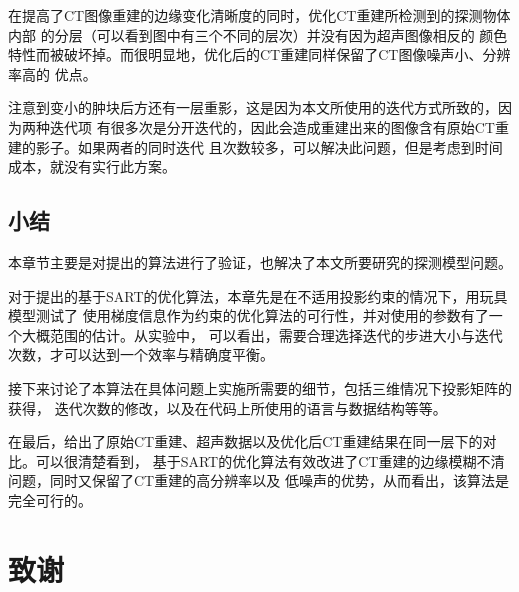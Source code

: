 在提高了CT图像重建的边缘变化清晰度的同时，优化CT重建所检测到的探测物体内部
的分层（可以看到图中有三个不同的层次）并没有因为超声图像相反的
颜色特性而被破坏掉。而很明显地，优化后的CT重建同样保留了CT图像噪声小、分辨率高的
优点。

注意到变小的肿块后方还有一层重影，这是因为本文所使用的迭代方式所致的，因为两种迭代项
有很多次是分开迭代的，因此会造成重建出来的图像含有原始CT重建的影子。如果两者的同时迭代
且次数较多，可以解决此问题，但是考虑到时间成本，就没有实行此方案。
\section{小结}
本章节主要是对提出的算法进行了验证，也解决了本文所要研究的探测模型问题。

对于提出的基于SART的优化算法，本章先是在不适用投影约束的情况下，用玩具模型测试了
使用梯度信息作为约束的优化算法的可行性，并对使用的参数有了一个大概范围的估计。从实验中，
可以看出，需要合理选择迭代的步进大小与迭代次数，才可以达到一个效率与精确度平衡。

接下来讨论了本算法在具体问题上实施所需要的细节，包括三维情况下投影矩阵的获得，
迭代次数的修改，以及在代码上所使用的语言与数据结构等等。

在最后，给出了原始CT重建、超声数据以及优化后CT重建结果在同一层下的对比。可以很清楚看到，
基于SART的优化算法有效改进了CT重建的边缘模糊不清问题，同时又保留了CT重建的高分辨率以及
低噪声的优势，从而看出，该算法是完全可行的。
\backmatter


\clearpage
\makeatletter
\@mainmattertrue
{}
\@mainmatterfalse
\makeatother

\chapter{致谢}




